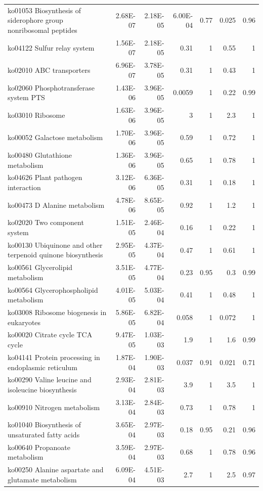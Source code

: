 {\begin{longtable}{ | l | r | r | r | r | r | r  | }
		
		ko01053 Biosynthesis of siderophore group nonribosomal peptides & 2.68E-07 & 2.18E-05 & 6.00E-04 & 0.77 & 0.025 & 0.96\\ 
		ko04122 Sulfur relay system & 1.56E-07 & 2.18E-05 & 0.31 & 1 & 0.55 & 1\\ 
		ko02010 ABC transporters & 6.96E-07 & 3.78E-05 & 0.31 & 1 & 0.43 & 1\\ 
		ko02060 Phosphotransferase system PTS  & 1.43E-06 & 3.96E-05 & 0.0059 & 1 & 0.22 & 0.99\\ 
		ko03010 Ribosome & 1.63E-06 & 3.96E-05 & 3 & 1 & 2.3 & 1\\ 
		ko00052 Galactose metabolism & 1.70E-06 & 3.96E-05 & 0.59 & 1 & 0.72 & 1\\ 
		ko00480 Glutathione metabolism & 1.36E-06 & 3.96E-05 & 0.65 & 1 & 0.78 & 1\\ 
		ko04626 Plant pathogen interaction & 3.12E-06 & 6.36E-05 & 0.31 & 1 & 0.18 & 1\\ 
		ko00473 D Alanine metabolism & 4.78E-06 & 8.65E-05 & 0.92 & 1 & 1.2 & 1\\ 
		ko02020 Two component system & 1.51E-05 & 2.46E-04 & 0.16 & 1 & 0.22 & 1\\ 
		ko00130 Ubiquinone and other terpenoid quinone biosynthesis & 2.95E-05 & 4.37E-04 & 0.47 & 1 & 0.61 & 1\\ 
		ko00561 Glycerolipid metabolism & 3.51E-05 & 4.77E-04 & 0.23 & 0.95 & 0.3 & 0.99\\ 
		ko00564 Glycerophospholipid metabolism & 4.01E-05 & 5.03E-04 & 0.41 & 1 & 0.48 & 1\\ 
		ko03008 Ribosome biogenesis in eukaryotes & 5.86E-05 & 6.82E-04 & 0.058 & 1 & 0.072 & 1\\ 
		ko00020 Citrate cycle TCA cycle  & 9.47E-05 & 1.03E-03 & 1.9 & 1 & 1.6 & 0.99\\ 
		ko04141 Protein processing in endoplasmic reticulum & 1.87E-04 & 1.90E-03 & 0.037 & 0.91 & 0.021 & 0.71\\ 
		ko00290 Valine leucine and isoleucine biosynthesis & 2.93E-04 & 2.81E-03 & 3.9 & 1 & 3.5 & 1\\ 
		ko00910 Nitrogen metabolism & 3.13E-04 & 2.84E-03 & 0.73 & 1 & 0.78 & 1\\ 
		ko01040 Biosynthesis of unsaturated fatty acids & 3.65E-04 & 2.97E-03 & 0.18 & 0.95 & 0.21 & 0.96\\ 
		ko00640 Propanoate metabolism & 3.59E-04 & 2.97E-03 & 0.68 & 1 & 0.78 & 0.96\\ 
		ko00250 Alanine aspartate and glutamate metabolism & 6.09E-04 & 4.51E-03 & 2.7 & 1 & 2.5 & 0.97\\ 

\end{longtable}}
